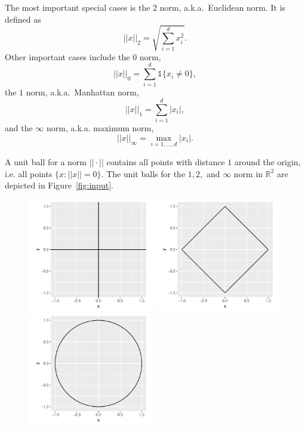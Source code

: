 \documentclass[12pt, twoside]{article}
\newcommand{\R}{\mathbb{R}}
\newcommand{\1}{\mathbb{1}}
\begin{document}
The most important special cases is the $2$ norm, a.k.a.\ Euclidean norm. It is defined as
$$||x||_2 = \sqrt{\sum_{i = 1}^d x_i^2}.$$
Other important cases include the $0$ norm,
$$||x||_0 = \sum_{i = 1}^d \1\{x_i \neq 0\},$$
the $1$ norm, a.k.a.\ Manhattan norm,
$$||x||_1 = \sum_{i = 1}^d |x_i|,$$
and the $\infty$ norm, a.k.a. maximum norm,
$$||x||_\infty = \max_{i = 1, \ldots, d} |x_i|.$$

A unit ball for a norm $||\cdot||$ contains all points with distance $1$ around the origin, i.e. all points $\{x: ||x|| = 0\}$. The unit balls for the $1, 2,$ and $\infty$ norm in $\R^2$ are depicted in Figure~\ref{fig:input}.
\begin{figure}[ht]
    \centering
    \includegraphics[width=0.49\textwidth]{plots/unit_circle_0.pdf}
    \includegraphics[width=0.49\textwidth]{plots/unit_circle_1.pdf}
    \includegraphics[width=0.49\textwidth]{plots/unit_circle_2.pdf}

\end{figure}
\end{document}
